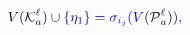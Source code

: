 \documentclass[12pt]{article}
\begin{document}
\makeatletter
\renewcommand*{\@textcolor}[3]{%
  \protect\leavevmode
  \begingroup
    \color#1{#2}#3%
  \endgroup
}
\makeatother
\begin{displaymath}
\mathcolor[RGB]{0,0,15}{V} \mathcolor[RGB]{0,0,30}{(} \mathcal { \mathcolor[RGB]{0,0,45}{K} } _ { \mathcolor[RGB]{0,0,60}{a} } ^ { \mathcolor[RGB]{0,0,75}{\ell} } \mathcolor[RGB]{0,0,90}{)} \mathcolor[RGB]{0,0,105}{\cup} \mathcolor[RGB]{0,0,120}{\{} \mathcolor[RGB]{0,0,135}{\eta} _ { \mathcolor[RGB]{0,0,150}{1} } \mathcolor[RGB]{0,0,165}{\}} \mathcolor[RGB]{0,0,180}{=} \mathcolor[RGB]{0,0,195}{\sigma} _ { \mathcolor[RGB]{0,0,210}{i} _ { \mathcolor[RGB]{0,0,225}{j} } } \mathcolor[RGB]{0,0,240}{(} \mathcolor[RGB]{0,0,255}{V} \mathcolor[RGB]{0,15,0}{(} \mathcal { \mathcolor[RGB]{0,15,15}{P} } _ { \mathcolor[RGB]{0,15,30}{a} } ^ { \mathcolor[RGB]{0,15,45}{\ell} } \mathcolor[RGB]{0,15,60}{)} \mathcolor[RGB]{0,15,75}{)} \mathcolor[RGB]{0,15,90}{,}
\end{displaymath}
\end{document}

